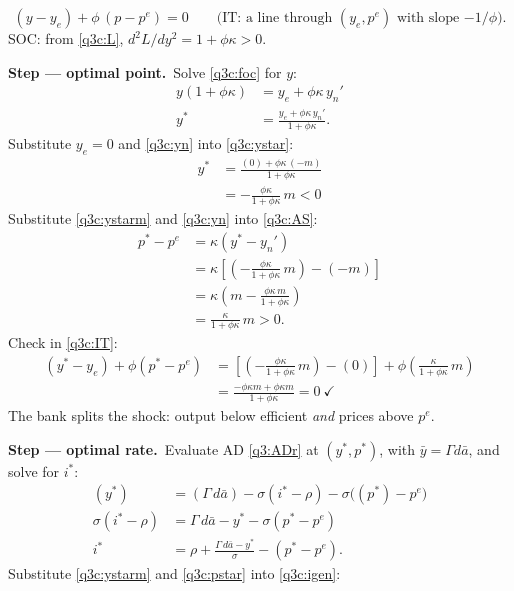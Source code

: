\documentclass[11pt,a4paper]{article}
\newcommand{\passo}[2]{\par\smallskip\noindent\textbf{Step --- #1.}~#2}
\begin{document}
\begin{sol}
\begin{equation}
\boxed{(y-y_e)+\phi\,(p-p^e)=0}\qquad\text{(IT: a line through $(y_e,p^e)$ with slope $-1/\phi$).} \label{q3c:IT}
\end{equation}
SOC: from \eqref{q3c:L}, $d^2L/dy^2=1+\phi\kappa>0$.
\passo{optimal point}{Solve \eqref{q3c:foc} for $y$:}
\begin{align}
y(1+\phi\kappa) &= y_e+\phi\kappa\,y_n'\nonumber\\
y^\ast &= \frac{y_e+\phi\kappa\,y_n'}{1+\phi\kappa}. \label{q3c:ystar}
\end{align}
Substitute $y_e=0$ and \eqref{q3c:yn} into \eqref{q3c:ystar}:
\begin{align}
y^\ast &= \frac{(0)+\phi\kappa\,(-m)}{1+\phi\kappa}\nonumber\\
&= \boxed{-\frac{\phi\kappa}{1+\phi\kappa}\,m<0} \label{q3c:ystarm}
\end{align}
Substitute \eqref{q3c:ystarm} and \eqref{q3c:yn} into \eqref{q3c:AS}:
\begin{align}
p^\ast-p^e &= \kappa(y^\ast-y_n')\nonumber\\
&= \kappa\left[\left(-\frac{\phi\kappa}{1+\phi\kappa}\,m\right)-(-m)\right]\nonumber\\
&= \kappa\left(m-\frac{\phi\kappa\,m}{1+\phi\kappa}\right)\nonumber\\
&= \boxed{\frac{\kappa}{1+\phi\kappa}\,m>0}. \label{q3c:pstar}
\end{align}
Check in \eqref{q3c:IT}:
\begin{align*}
(y^\ast-y_e)+\phi(p^\ast-p^e) &= \left[\left(-\frac{\phi\kappa}{1+\phi\kappa}\,m\right)-(0)\right]
+\phi\left(\frac{\kappa}{1+\phi\kappa}\,m\right)\\
&= \frac{-\phi\kappa m+\phi\kappa m}{1+\phi\kappa}=0\ \checkmark
\end{align*}
The bank splits the shock: output below efficient \emph{and} prices above $p^e$.
\passo{optimal rate}{Evaluate AD \eqref{q3:ADr} at $(y^\ast,p^\ast)$, with $\bar y=\Gamma d\bar a$,
and solve for $i^\ast$:}
\begin{align}
(y^\ast) &= (\Gamma\,d\bar a)-\sigma(i^\ast-\rho)-\sigma\big((p^\ast)-p^e\big)\nonumber\\
\sigma(i^\ast-\rho) &= \Gamma\,d\bar a-y^\ast-\sigma(p^\ast-p^e)\nonumber\\
i^\ast &= \rho+\frac{\Gamma\,d\bar a-y^\ast}{\sigma}-(p^\ast-p^e). \label{q3c:igen}
\end{align}
Substitute \eqref{q3c:ystarm} and \eqref{q3c:pstar} into \eqref{q3c:igen}:
\begin{align}

\end{align}
\end{sol}
\end{document}
